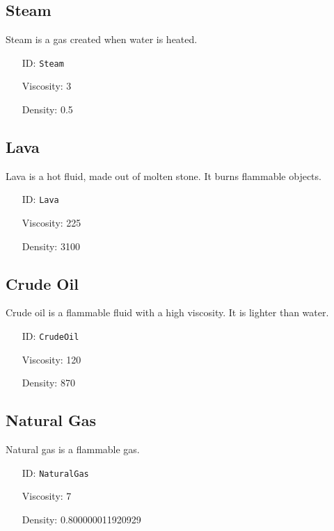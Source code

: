 \subsection{Steam}\label{subsec:fluids_steam}
Steam is a gas created when water is heated.
\newline
\begin{itemize}[nosep]
\item[ID:] \texttt{Steam}
\item[Viscosity:] 3
\item[Density:] 0.5
\end{itemize}

\subsection{Lava}\label{subsec:fluids_lava}
Lava is a hot fluid, made out of molten stone. It burns flammable objects.
\newline
\begin{itemize}[nosep]
\item[ID:] \texttt{Lava}
\item[Viscosity:] 225
\item[Density:] 3100
\end{itemize}

\subsection{Crude Oil}\label{subsec:fluids_crude oil}
Crude oil is a flammable fluid with a high viscosity. It is lighter than water.
\newline
\begin{itemize}[nosep]
\item[ID:] \texttt{CrudeOil}
\item[Viscosity:] 120
\item[Density:] 870
\end{itemize}

\subsection{Natural Gas}\label{subsec:fluids_natural gas}
Natural gas is a flammable gas.
\newline
\begin{itemize}[nosep]
\item[ID:] \texttt{NaturalGas}
\item[Viscosity:] 7
\item[Density:] 0.800000011920929
\end{itemize}

